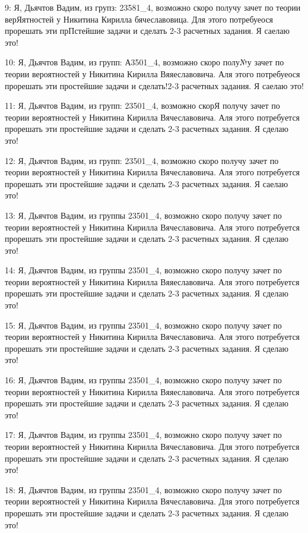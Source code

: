 {9: Я, Дьячтов Вадим, из групз: 23581\_4, возможно скоро получу зачет по теории верЯятностей у Никитина Кирилла бячеславовица. Для этого потребуеося прорешать эти прПстейшие задачи и сделать 2-3 расчетных задания. Я саелаю это!

10: Я, Дьячтов Вадим, из групп: А3501\_4, возможно скоро полу№у зачет по теории вероятностей у Никитина Кирилла Вяяеславовича. Аля этого потребуеося прорешать эти простейшие задачи и сделать!2-3 расчетных задания. Я саелаю это!

11: Я, Дьячтов Вадим, из групп: 23501\_4, возможно скорЯ получу зачет по теории вероятностей у Никитина Кирилла Вячеславовича. Аля этого потребуется прорешать эти простейшие задачи и сделать 2-3 расчетных задания. Я сделаю это!

12: Я, Дьячтов Вадим, из групп: 23501\_4, возможно скоро получу зачет по теории вероятностей у Никитина Кирилла Вячеславовича. Аля этого потребуется прорешать эти простейшие задачи и сделать 2-3 расчетных задания. Я саелаю это!

13: Я, Дьячтов Вадим, из группы 23501\_4, возможно скоро получу зачет по теории вероятностей у Никитина Кирилла Вячеславовича. Аля этого потребуется прорешать эти простейшие задачи и сделать 2-3 расчетных задания. Я сделаю это!

14: Я, Дьячтов Вадим, из группы 23501\_4, возможно скоро получу зачет по теории вероятностей у Никитина Кирилла Вяяеславовича. Аля этого потребуется прорешать эти простейшие задачи и сделать 2-3 расчетных задания. Я сделаю это!

15: Я, Дьячтов Вадим, из группы 23501\_4, возможно скоро получу зачет по теории вероятностей у Никитина Кирилла Вячеславовича. Аля этого потребуется прорешать эти простейшие задачи и сделать 2-3 расчетных задания. Я сделаю это!

16: Я, Дьячтов Вадим, из группы 23501\_4, возможно скоро получу зачет по теории вероятностей у Никитина Кирилла Вяяеславовича. Аля этого потребуется прорешать эти простейшие задачи и сделать 2-3 расчетных задания. Я сделаю это!

17: Я, Дьячтов Вадим, из группы 23501\_4, возможно скоро получу зачет по теории вероятностей у Никитина Кирилла Вячеславовича. Для этого потребуется прорешать эти простейшие задачи и сделать 2-3 расчетных задания. Я сделаю это!

18: Я, Дьячтов Вадим, из группы 23501\_4, возможно скоро получу зачет по теории вероятностей у Никитина Кирилла Вячеславовича. Для этого потребуется прорешать эти простейшие задачи и сделать 2-3 расчетных задания. Я сделаю это!

}
\vspace{0.5cm}

